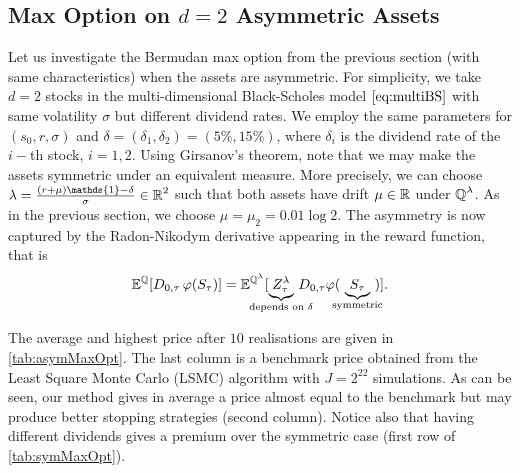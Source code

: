 \subsection{Max Option on $d=2$ Asymmetric Assets }\label{sec:maxCallAsym}

Let us investigate the Bermudan max option from the previous section (with same characteristics) when the assets are  asymmetric. For simplicity, we take $d=2$ 
stocks in the multi-dimensional Black-Scholes model $\eqref{eq:multiBS}$ with same volatility $\sigma$ but different dividend rates. We employ the same parameters for $(s_0,r,\sigma)$ and $\delta = (\delta_1,\delta_2) = (5 \%,15 \%)$, where $\delta_i$ is the dividend rate of the $i-$th stock, $i=1,2$. Using Girsanov's theorem, note that we may make the assets symmetric under an equivalent measure. More precisely, we can choose $\lambda = \frac{(r+\mu)\mathds{1} - \delta}{\sigma} \in \R^2$ such that both assets have drift $\mu \in \operatorname{\mathbb{R}}$ under $\operatorname{\mathbb{Q}}^{\lambda}$. As in the previous section, we choose  $\mu = \mu_2=0.01 \log 2$. The asymmetry is now captured by the Radon-Nikodym derivative appearing in the reward function, that is 
\begin{equation}\label{eq:GirsanovAsym}
    \E^{\Q}[D_{0,\tau}\, \varphi(S_{\tau})] =  \E^{\Q^{\lambda}}[\underbrace{Z^{\lambda}_{\tau}}_{\mathclap{\text{depends on $\delta$}}}\, D_{0,\tau} \varphi(\ \underbrace{S_{\tau}}_{\mathclap{\text{symmetric}}} \ )]. 
\end{equation}


The average and highest price after $10$ realisations are given in \cref{tab:asymMaxOpt}. The last column  is a benchmark price obtained from the Least Square Monte Carlo (LSMC) algorithm \cite{LSMC}  with $J =2^{22}$  simulations. As can be seen, our method gives in average a price almost equal to the benchmark but may produce better  stopping strategies (second column). Notice also that having different dividends gives a premium over the symmetric case (first row of \cref{tab:symMaxOpt}).  %

